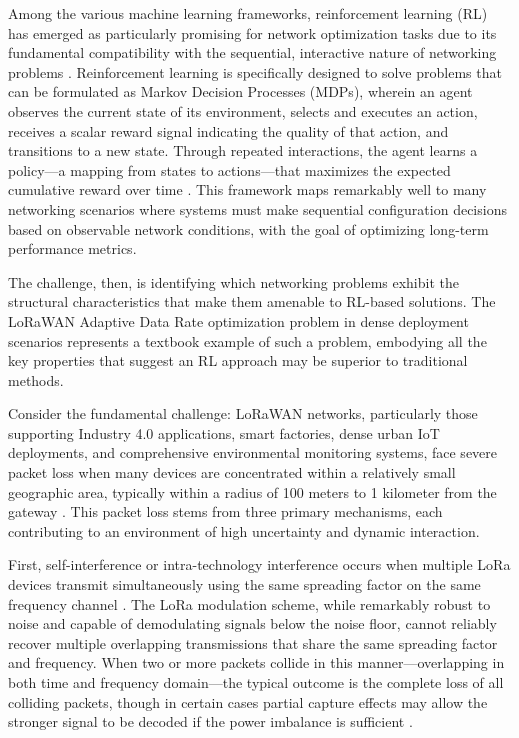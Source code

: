 \documentclass[12pt,a4paper]{article}
\begin{document}
Among the various machine learning frameworks, reinforcement learning (RL) has emerged as particularly promising for network optimization tasks due to its fundamental compatibility with the sequential, interactive nature of networking problems \cite{luong2019applications}. Reinforcement learning is specifically designed to solve problems that can be formulated as Markov Decision Processes (MDPs), wherein an agent observes the current state of its environment, selects and executes an action, receives a scalar reward signal indicating the quality of that action, and transitions to a new state. Through repeated interactions, the agent learns a policy—a mapping from states to actions—that maximizes the expected cumulative reward over time \cite{sutton2018reinforcement}. This framework maps remarkably well to many networking scenarios where systems must make sequential configuration decisions based on observable network conditions, with the goal of optimizing long-term performance metrics.

The challenge, then, is identifying which networking problems exhibit the structural characteristics that make them amenable to RL-based solutions. The LoRaWAN Adaptive Data Rate optimization problem in dense deployment scenarios represents a textbook example of such a problem, embodying all the key properties that suggest an RL approach may be superior to traditional methods.

Consider the fundamental challenge: LoRaWAN networks, particularly those supporting Industry 4.0 applications, smart factories, dense urban IoT deployments, and comprehensive environmental monitoring systems, face severe packet loss when many devices are concentrated within a relatively small geographic area, typically within a radius of 100 meters to 1 kilometer from the gateway \cite{reynders2018improving}. This packet loss stems from three primary mechanisms, each contributing to an environment of high uncertainty and dynamic interaction.

First, self-interference or intra-technology interference occurs when multiple LoRa devices transmit simultaneously using the same spreading factor on the same frequency channel \cite{croce2018impact}. The LoRa modulation scheme, while remarkably robust to noise and capable of demodulating signals below the noise floor, cannot reliably recover multiple overlapping transmissions that share the same spreading factor and frequency. When two or more packets collide in this manner—overlapping in both time and frequency domain—the typical outcome is the complete loss of all colliding packets, though in certain cases partial capture effects may allow the stronger signal to be decoded if the power imbalance is sufficient \cite{amaro2018understanding}.
\end{document}
